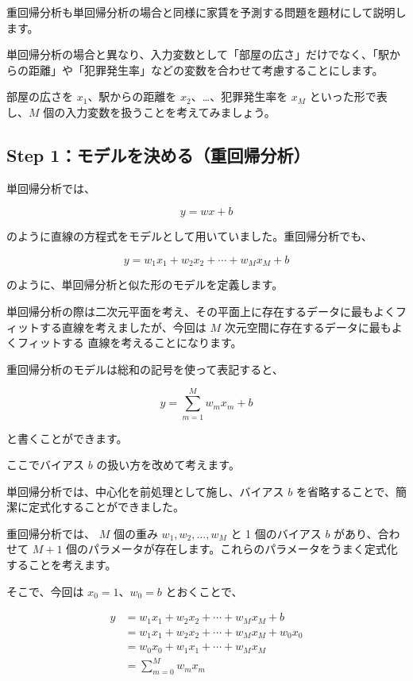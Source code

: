 重回帰分析も単回帰分析の場合と同様に家賃を予測する問題を題材にして説明します。

単回帰分析の場合と異なり、入力変数として「部屋の広さ」だけでなく、「駅からの距離」や「犯罪発生率」などの変数を合わせて考慮することにします。

部屋の広さを $x_{1}$、駅からの距離を $x_{2}$、…、犯罪発生率を $x_{M}$ といった形で表し、$M$ 個の入力変数を扱うことを考えてみましょう。


\subsection{Step 1：モデルを決める（重回帰分析）}


単回帰分析では、


\[
y = wx + b
\]


のように直線の方程式をモデルとして用いていました。重回帰分析でも、


\[
y = w_{1}x_{1} + w_{2}x_{2} + \cdots + w_{M}x_{M} + b
\]


のように、単回帰分析と似た形のモデルを定義します。

単回帰分析の際は二次元平面を考え、その平面上に存在するデータに最もよくフィットする直線を考えましたが、今回は $M$ 次元空間に存在するデータに最もよくフィットする 直線を考えることになります。


重回帰分析のモデルは総和の記号を使って表記すると、


\[
y = \sum_{m=1}^{M} w_{m} x_{m} + b
\]


と書くことができます。


ここでバイアス $b$ の扱い方を改めて考えます。

単回帰分析では、中心化を前処理として施し、バイアス $b$ を省略することで、簡潔に定式化することができました。


重回帰分析では、 $M$ 個の重み $w_{1}, w_{2}, \dots, w_{M}$ と 1 個のバイアス $b$ があり、合わせて $M + 1$ 個のパラメータが存在します。これらのパラメータをうまく定式化することを考えます。

そこで、今回は $x_0 = 1$、$w_0 = b$ とおくことで、


\[
\begin{aligned}
y
&= w_{1}x_{1} + w_{2}x_{2} + \cdots + w_{M}x_{M} + b \\
&= w_{1}x_{1} + w_{2}x_{2} + \cdots + w_{M}x_{M} + w_{0}x_{0} \\
&= w_{0}x_{0} + w_{1}x_{1} + \cdots + w_{M}x_{M} \\
&= \sum_{m=0}^M w_{m} x_{m}
\end{aligned}
\]


